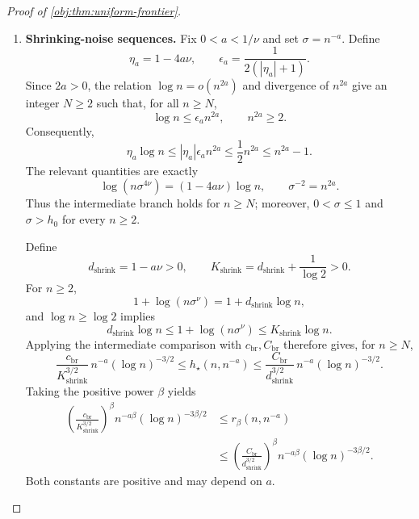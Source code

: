\documentclass[11pt]{article}
\begin{document}
\begin{proof}[Proof of \cref{obj:thm:uniform-frontier}]
\begin{enumerate}
At the direct--noisy equality \(\sigma=h_0\), the direct result gives
\[
h_\star(n,\sigma)=\sigma=h_0,\qquad
\log(n\sigma^\nu)=0.
\]
The intermediate scalar equation then holds at \(z=1\), and
\(\sigma z^{-3/2}=\sigma\).

Finally, \(c_{\mathrm{br}}\le1,c_\tau,c_{\mathrm{pow}}\) and
\(C_{\mathrm{br}}\ge A_{\mathrm{int}},C_\tau,C_{\mathrm{pow}}\).
All comparison factors above are positive. Replacing their lower constants
by \(c_{\mathrm{br}}\) and their upper constants by \(C_{\mathrm{br}}\)
therefore gives simultaneous branch comparisons, with the exact equations
and interfaces unchanged.

\item \textbf{Shrinking-noise sequences.}
Fix \(0<a<1/\nu\) and set \(\sigma=n^{-a}\). Define
\[
\eta_a=1-4a\nu,\qquad
\epsilon_a=\frac1{2(|\eta_a|+1)}.
\]
Since \(2a>0\), the relation \(\log n=o(n^{2a})\) and divergence of \(n^{2a}\)
give an integer \(N\ge2\) such that, for all \(n\ge N\),
\[
\log n\le\epsilon_a n^{2a},
\qquad n^{2a}\ge2.
\]
Consequently,
\[
\eta_a\log n
\le|\eta_a|\epsilon_a n^{2a}
\le\frac12n^{2a}
\le n^{2a}-1.
\]
The relevant quantities are exactly
\[
\log(n\sigma^{4\nu})=(1-4a\nu)\log n,
\qquad
\sigma^{-2}=n^{2a}.
\]
Thus the intermediate branch holds for \(n\ge N\); moreover,
\(0<\sigma\le1\) and \(\sigma>h_0\) for every \(n\ge2\).

Define
\[
d_{\mathrm{shrink}}=1-a\nu>0,\qquad
K_{\mathrm{shrink}}=d_{\mathrm{shrink}}+\frac1{\log2}>0.
\]
For \(n\ge2\),
\[
1+\log(n\sigma^\nu)=1+d_{\mathrm{shrink}}\log n,
\]
and \(\log n\ge\log2\) implies
\[
d_{\mathrm{shrink}}\log n
\le1+\log(n\sigma^\nu)
\le K_{\mathrm{shrink}}\log n.
\]
Applying the intermediate comparison with \(c_{\mathrm{br}},C_{\mathrm{br}}\)
therefore gives, for \(n\ge N\),
\[
\frac{c_{\mathrm{br}}}{K_{\mathrm{shrink}}^{3/2}}
\,n^{-a}(\log n)^{-3/2}
\le h_\star(n,n^{-a})
\le
\frac{C_{\mathrm{br}}}{d_{\mathrm{shrink}}^{3/2}}
\,n^{-a}(\log n)^{-3/2}.
\]
Taking the positive power \(\beta\) yields
\[
\begin{aligned}
\left(\frac{c_{\mathrm{br}}}{K_{\mathrm{shrink}}^{3/2}}\right)^\beta
n^{-a\beta}(\log n)^{-3\beta/2}
&\le r_\beta(n,n^{-a})\\
&\le
\left(\frac{C_{\mathrm{br}}}{d_{\mathrm{shrink}}^{3/2}}\right)^\beta
n^{-a\beta}(\log n)^{-3\beta/2}.
\end{aligned}
\]
Both constants are positive and may depend on \(a\).


\end{enumerate}
\end{proof}
\end{document}

